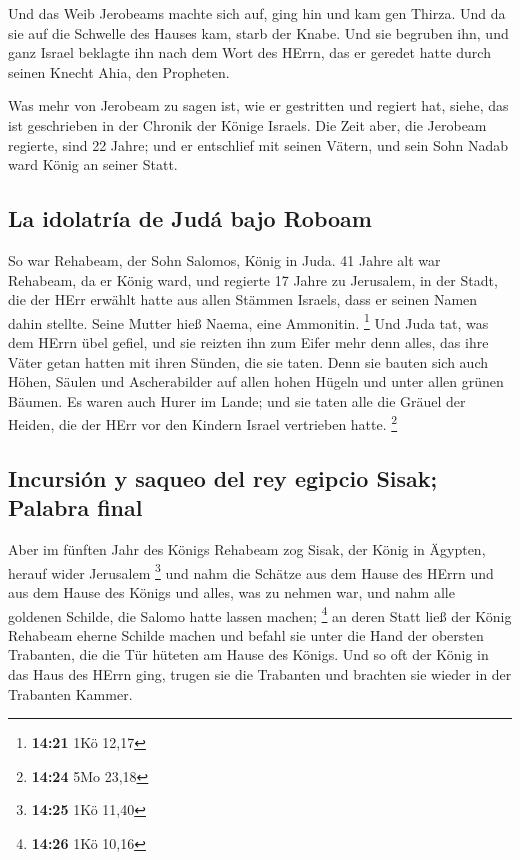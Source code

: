  Und das Weib Jerobeams machte sich auf, ging hin und kam
gen Thirza. Und da sie auf die Schwelle des Hauses kam, starb der Knabe.
 Und sie begruben ihn, und ganz Israel beklagte ihn nach
dem Wort des HErrn, das er geredet hatte durch seinen Knecht Ahia, den
Propheten.

 Was mehr von Jerobeam zu sagen ist, wie er gestritten
und regiert hat, siehe, das ist geschrieben in der Chronik der Könige
Israels.  Die Zeit aber, die Jerobeam regierte, sind 22
Jahre; und er entschlief mit seinen Vätern, und sein Sohn Nadab ward
König an seiner Statt.

\hypertarget{la-idolatruxeda-de-juduxe1-bajo-roboam}{%
\subsection{La idolatría de Judá bajo
Roboam}\label{la-idolatruxeda-de-juduxe1-bajo-roboam}}

 So war Rehabeam, der Sohn Salomos, König in Juda. 41
Jahre alt war Rehabeam, da er König ward, und regierte 17 Jahre zu
Jerusalem, in der Stadt, die der HErr erwählt hatte aus allen Stämmen
Israels, dass er seinen Namen dahin stellte. Seine Mutter hieß Naema,
eine Ammonitin. \footnote{\textbf{14:21} 1Kö 12,17}  Und
Juda tat, was dem HErrn übel gefiel, und sie reizten ihn zum Eifer mehr
denn alles, das ihre Väter getan hatten mit ihren Sünden, die sie taten.
 Denn sie bauten sich auch Höhen, Säulen und
Ascherabilder auf allen hohen Hügeln und unter allen grünen Bäumen.
 Es waren auch Hurer im Lande; und sie taten alle die
Gräuel der Heiden, die der HErr vor den Kindern Israel vertrieben hatte.
\footnote{\textbf{14:24} 5Mo 23,18}

\hypertarget{incursiuxf3n-y-saqueo-del-rey-egipcio-sisak-palabra-final}{%
\subsection{Incursión y saqueo del rey egipcio Sisak; Palabra
final}\label{incursiuxf3n-y-saqueo-del-rey-egipcio-sisak-palabra-final}}

 Aber im fünften Jahr des Königs Rehabeam zog Sisak, der
König in Ägypten, herauf wider Jerusalem \footnote{\textbf{14:25} 1Kö
  11,40}  und nahm die Schätze aus dem Hause des HErrn
und aus dem Hause des Königs und alles, was zu nehmen war, und nahm alle
goldenen Schilde, die Salomo hatte lassen machen; \footnote{\textbf{14:26}
  1Kö 10,16}  an deren Statt ließ der König Rehabeam
eherne Schilde machen und befahl sie unter die Hand der obersten
Trabanten, die die Tür hüteten am Hause des Königs.  Und
so oft der König in das Haus des HErrn ging, trugen sie die Trabanten
und brachten sie wieder in der Trabanten Kammer.

